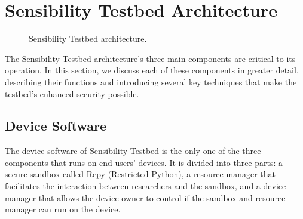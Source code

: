 \section{Sensibility Testbed Architecture}\label{sec-design}

\begin{figure}
\caption{\small Sensibility Testbed architecture. \label{fig-arch}}
\end{figure}

The Sensibility Testbed architecture's three main components are critical 
to its operation. In this section, we discuss each of these components in 
greater detail, describing their functions and introducing several key 
techniques that make the testbed's enhanced security possible. 

\subsection{Device Software}\label{sec-repy}

The device software of Sensibility Testbed is the only one of the three 
components that runs on end users' devices. It is divided into three 
parts: a secure sandbox called Repy (Restricted Python), a resource 
manager that facilitates the interaction between researchers and the 
sandbox, and a device manager that allows the device owner to control 
if the sandbox and resource manager can run on the device.



